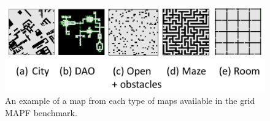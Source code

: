 \documentclass[letterpaper]{article} %
\newcommand{\mapf}{\ac{MAPF}\xspace}
\begin{document}
\begin{figure}[tb]
    \centering
    \includegraphics[width=\columnwidth]{map-types.pdf}
    \caption{An example of a map from each type of maps available in the grid \mapf benchmark.}
    \label{fig:map-types}
\end{figure}

\end{document}
